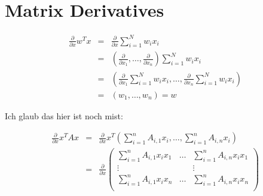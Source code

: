 \section*{Matrix Derivatives}


\begin{eqnarray}
    \frac{\partial}{\partial x}w^Tx&=& \frac{\partial}{\partial x} \sum_{i=1}^N w_i x_i  \\
    &=&\left(\frac{\partial}{\partial x_1}, \dots, \frac{\partial}{\partial x_n} \right) \sum_{i=1}^N w_i x_i \\
    &=&\left(\frac{\partial}{\partial x_1}\sum_{i=1}^N w_i x_i , \dots, \frac{\partial}{\partial x_n} \sum_{i=1}^N w_i x_i \right) \\
    &=& (w_1,\dots,w_n) = w
\end{eqnarray}


Ich glaub das hier ist noch mist:

\begin{eqnarray}
    \frac{\partial}{\partial x}x^TAx&=& \frac{\partial}{\partial x} x^T \left( \sum_{i=1}^n A_{i,1} x_i,\dots,\sum_{i=1}^n A_{i,n} x_i \right) \\
    &=& \frac{\partial}{\partial x} \left( \begin{matrix} 
    \sum_{i=1}^n A_{i,1} x_i x_1 & \dots &\sum_{i=1}^n A_{i,n} x_i x_1 \\
    \vdots&&\vdots \\
    \sum_{i=1}^n A_{i,1} x_i x_n & \dots &\sum_{i=1}^n A_{i,n} x_i x_n \\
    \end{matrix}\right)
\end{eqnarray}